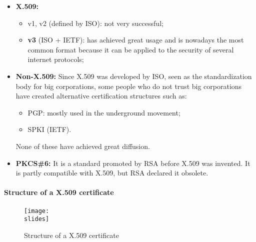 \begin{itemize}
    \item \textbf{X.509:}
    \begin{itemize}
        \item v1, v2 (defined by ISO): not very successful;
        \item \textbf{v3} (ISO + IETF): has achieved great usage and is nowadays the most common format because
        it can be applied to the security of several internet protocols;
    \end{itemize}
    \item \textbf{Non-X.509:} Since X.509 was developed by ISO, seen as the standardization body for
    big corporations, some people who do not trust big corporations have created alternative certification
    structures such as:
    \begin{itemize}
        \item PGP: mostly used in the underground movement;
        \item SPKI (IETF).
    \end{itemize}
    None of these have achieved great diffusion.
    \item \textbf{PKCS\#6:} It is a standard promoted by RSA before X.509 was invented. It is partly
    compatible with X.509, but RSA declared it obsolete.
\end{itemize}

\paragraph{Structure of a X.509 certificate}

\begin{figure}[h]
    \centering
    \texttt{[image: \\slides]}
    \caption{Structure of a X.509 certificate}
\end{figure}

